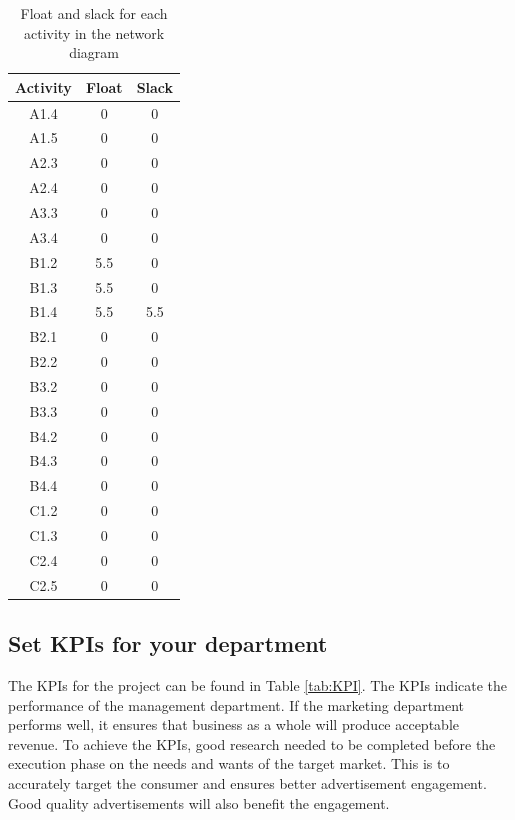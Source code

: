 \documentclass{article}
\begin{document}
\begin{table}[H]
    \centering
     \caption{Float and slack for each activity in the network diagram}
    \begin{tabular}{c|cc}
        Activity&Float &Slack\\
        \hline
        A1.4&0&0\\
        A1.5&0&0\\
        A2.3&0&0\\
        A2.4&0&0\\
        A3.3&0&0\\
        A3.4&0&0\\
        B1.2&5.5&0\\
        B1.3&5.5&0\\
        B1.4&5.5&5.5\\
        B2.1&0&0\\
        B2.2&0&0\\
        B3.2&0&0\\
        B3.3&0&0\\
        B4.2&0&0\\
        B4.3&0&0\\
        B4.4&0&0\\
        C1.2&0&0\\
        C1.3&0&0\\
        C2.4&0&0\\
        C2.5&0&0\\
        \hline
        \hline

    \end{tabular}
   
    \label{tab:Float}
\end{table}
 
\subsection{Set KPIs for your department}

The KPIs for the project can be found in Table \ref{tab:KPI}. The KPIs indicate the performance of the management department. If the marketing department performs well, it ensures that business as a whole will produce acceptable revenue. To achieve the KPIs, good research needed to be completed before the execution phase on the needs and wants of the target market. This is to accurately target the consumer and ensures better advertisement engagement. Good quality advertisements will also benefit the engagement. 
\end{document}
